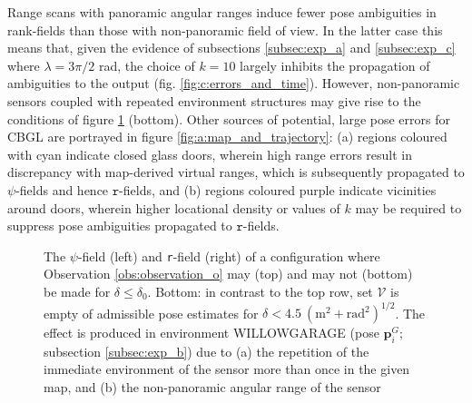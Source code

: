 Range scans with panoramic angular ranges induce fewer pose ambiguities in
rank-fields than those with non-panoramic field of view. In the latter case
this means that, given the evidence of subsections \ref{subsec:exp_a} and
\ref{subsec:exp_c} where $\lambda = 3\pi/2$ rad, the choice of $k=10$ largely
inhibits the propagation of ambiguities to the output (fig.
\ref{fig:c:errors_and_time}).  However, non-panoramic sensors coupled
with repeated environment structures may give rise to the conditions of figure
\ref{fig:h_and_h_not_fig} (bottom). Other sources of potential, large pose
errors for CBGL are portrayed in figure \ref{fig:a:map_and_trajectory}: (a)
regions coloured with cyan indicate closed glass doors, wherein high range
errors result in discrepancy with map-derived virtual ranges, which is
subsequently propagated to $\psi$-fields and hence $\texttt{r}$-fields, and (b)
regions coloured purple indicate vicinities around doors, wherein
higher locational density or values of $k$ may be required to suppress pose
ambiguities propagated to $\texttt{r}$-fields.

\begin{figure}
  
  \vspace{0.3cm}
  \caption{\small The $\psi$-field (left) and \texttt{r}-field (right) of a
           configuration where Observation \ref{obs:observation_o} may (top)
           and may not (bottom) be made for $\delta \leq \delta_0$. Bottom:
           in contrast to the top row, set $\mathcal{V}$ is empty of admissible
           pose estimates for $\delta < 4.5 \ (\text{m}^2 +
           \text{rad}^2)^{1/2}$. The effect is produced in environment
           WILLOWGARAGE (pose $\bm{p}_{i}^G$; subsection \ref{subsec:exp_b})
           due to (a) the repetition of the immediate environment of the sensor
           more than once in the given map, and (b) the non-panoramic angular
           range of the sensor}
  \vspace{-0.5cm}
  \label{fig:h_and_h_not_fig}
\end{figure}
